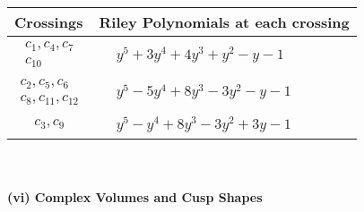 \documentclass[1p]{elsarticle_modified}
\theoremstyle{definition}
\begin{document}
\begin{tabular}{m{50pt}|m{274pt}}
Crossings & \hspace{64pt}Riley Polynomials at each crossing \\
\hline $$\begin{aligned}c_{1},c_{4},c_{7}\\c_{10}\end{aligned}$$&$\begin{aligned}
&y^5+3 y^4+4 y^3+y^2- y-1
\end{aligned}$\\
\hline $$\begin{aligned}c_{2},c_{5},c_{6}\\c_{8},c_{11},c_{12}\end{aligned}$$&$\begin{aligned}
&y^5-5 y^4+8 y^3-3 y^2- y-1
\end{aligned}$\\
\hline $$\begin{aligned}c_{3},c_{9}\end{aligned}$$&$\begin{aligned}
&y^5- y^4+8 y^3-3 y^2+3 y-1
\end{aligned}$\\
\hline
\end{tabular}\\~\\
\newpage\flushleft \textbf{(vi) Complex Volumes and Cusp Shapes}
\end{document}
